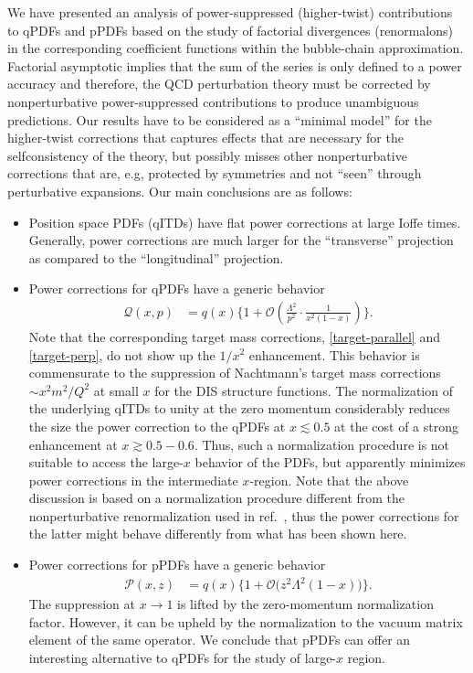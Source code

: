 \documentclass[aps,prd,twocolumn,a4paper,superscriptaddress,10pt,showpacs,notitlepage,floatfix]{revtex4-1}
\newcommand{\cQ}{\mathcal{Q}}
\begin{document}
We have presented an analysis of power-suppressed (higher-twist) contributions to qPDFs and pPDFs based on the study of factorial divergences (renormalons) in the corresponding coefficient functions within the bubble-chain approximation. Factorial asymptotic implies that the sum of the series is only defined to a power accuracy and therefore, the QCD perturbation theory must be corrected by nonperturbative power-suppressed contributions to produce unambiguous predictions. Our results have to be considered as a ``minimal model'' for the higher-twist corrections that captures effects that are necessary for the selfconsistency of the theory, but possibly misses other nonperturbative corrections that are, e.g, protected 
by symmetries and not ``seen'' through perturbative expansions. Our main conclusions are as follows:
\begin{itemize}
\item Position space PDFs (qITDs) have flat power corrections at large Ioffe times. Generally, power corrections are much 
      larger for the ``transverse'' projection as compared to the ``longitudinal'' projection. 
\item Power corrections for qPDFs have a generic behavior
\begin{align}
  \cQ (x,p) &=  q(x) \biggl\{1 + \mathcal{O}\left( \frac{\Lambda^2}{p^2}\cdot\frac{1}{{x^2(1-x)}}\right) \biggr\}.     
\end{align}
Note that the corresponding target mass corrections, \eqref{target-parallel} and \eqref{target-perp}, do not show up the  $1/x^2$ enhancement. This behavior is commensurate to the suppression of Nachtmann's target mass corrections $\sim x^2 m^2/Q^2$ at small $x$ for the DIS structure functions. The normalization of the underlying qITDs to unity at the zero momentum considerably reduces the size the power correction to the qPDFs at $ x \lesssim 0.5$ at the cost of a strong enhancement at $x\gtrsim 0.5-0.6$. Thus, such a normalization procedure is not suitable to access the large-$x$ behavior of the PDFs, but apparently minimizes power corrections in the intermediate $x$-region. Note that the above discussion is based on a normalization procedure different from the nonperturbative renormalization used in ref.~\cite{Chen:2018xof}, thus the power corrections for the latter might behave differently from what has been shown here.
 \item
Power corrections for pPDFs have a generic behavior
\begin{align}
\mathcal{P}(x,z) &= q(x)\Big\{1 + \mathcal{O}\big( z^2\!\Lambda^2{(1-x)}\big)\Big\}.
\end{align}
The suppression at $x\to 1$ is lifted by the zero-momentum normalization factor. However, it can be upheld by the normalization to the vacuum matrix element of the same operator. We conclude that pPDFs can offer an interesting alternative to qPDFs for the study of large-$x$ region.
\end{itemize}
\end{document}
